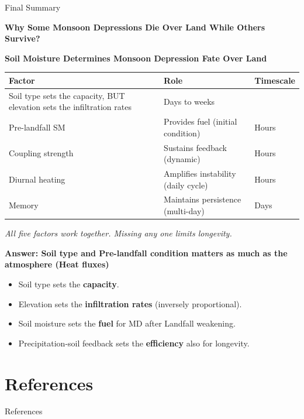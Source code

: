 \documentclass[8pt, aspectratio=169]{beamer}
\begin{document}
\begin{frame}{Final Summary}
    \begin{center}
        \textbf{Why Some Monsoon Depressions Die Over Land While Others Survive?}

        \vspace{0.5cm}
        \textbf{Soil Moisture Determines Monsoon Depression Fate Over Land}

        \vspace{0.5cm}
        \footnotesize
             \begin{tabular}{lll}
                 \toprule
                 \textbf{Factor} & \textbf{Role} & \textbf{Timescale} \\
                 \midrule
                 Soil type sets the capacity, BUT elevation sets the infiltration rates &  Days to weeks \\
                 Pre-landfall SM & Provides fuel (initial condition) & Hours \\
                 Coupling strength & Sustains feedback (dynamic) & Hours \\
                 Diurnal heating & Amplifies instability (daily cycle) & Hours \\
                 Memory & Maintains persistence (multi-day) & Days \\
                 \bottomrule
             \end{tabular}

            \vspace{0.3cm}
            \footnotesize
            \textit{All five factors work together. Missing any one limits longevity.}
    \end{center}

    \vspace{0.3cm}
    \textbf{Answer: Soil type and Pre-landfall condition matters as much as the atmosphere (Heat fluxes)}

    \vspace{0.3cm}
    \footnotesize
    \begin{itemize}
        \item Soil type sets the \textbf{capacity}.
        \item Elevation sets the \textbf{infiltration rates} (inversely proportional).
        \item Soil moisture sets the \textbf{fuel} for MD after Landfall weakening.
        \item Precipitation-soil feedback sets the \textbf{efficiency} also for longevity.
    \end{itemize}
\end{frame}

\section{References}
\begin{frame}[allowframebreaks]{References}
    \nocite{*}
    \scriptsize
    \printbibliography
\end{frame}
\end{document}
